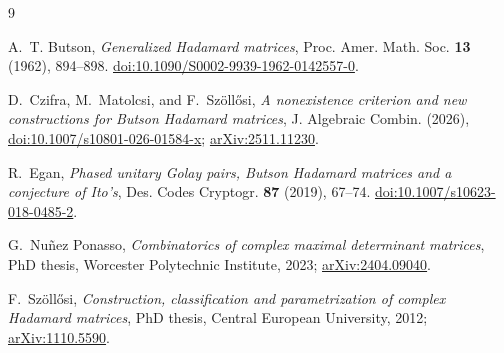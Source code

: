 \documentclass[11pt]{amsart}
\theoremstyle{remark}
\begin{document}
\begin{thebibliography}{9}

A.~T. Butson,
\emph{Generalized Hadamard matrices},
Proc. Amer. Math. Soc. \textbf{13} (1962), 894--898.
\href{https://doi.org/10.1090/S0002-9939-1962-0142557-0}{doi:10.1090/S0002-9939-1962-0142557-0}.

D.~Czifra, M.~Matolcsi, and F.~Szöll\H osi,
\emph{A nonexistence criterion and new constructions for Butson Hadamard
matrices},
J. Algebraic Combin. (2026),
\href{https://doi.org/10.1007/s10801-026-01584-x}{doi:10.1007/s10801-026-01584-x};
\href{https://arxiv.org/abs/2511.11230}{arXiv:2511.11230}.

R.~Egan,
\emph{Phased unitary Golay pairs, Butson Hadamard matrices and a conjecture
of Ito's},
Des. Codes Cryptogr. \textbf{87} (2019), 67--74.
\href{https://doi.org/10.1007/s10623-018-0485-2}{doi:10.1007/s10623-018-0485-2}.

G.~Nuñez Ponasso,
\emph{Combinatorics of complex maximal determinant matrices},
PhD thesis, Worcester Polytechnic Institute, 2023;
\href{https://arxiv.org/abs/2404.09040}{arXiv:2404.09040}.

F.~Szöll\H osi,
\emph{Construction, classification and parametrization of complex Hadamard
matrices},
PhD thesis, Central European University, 2012;
\href{https://arxiv.org/abs/1110.5590}{arXiv:1110.5590}.

\end{thebibliography}
\end{document}

